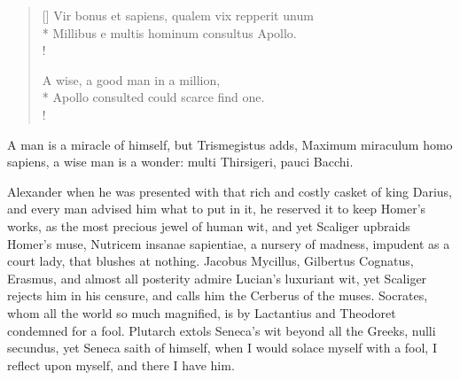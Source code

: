 {\settowidth{\versewidth}{Vir bonus et sapiens, qualem vix repperit unum}
\begin{verse}[\versewidth]
Vir bonus et sapiens, qualem vix repperit unum\\*
Millibus e multis hominum consultus Apollo.\\!

A wise, a good man in a million,\\*
Apollo consulted could scarce find one.\\!
\end{verse}

A man is a miracle of himself, but Trismegistus adds, Maximum miraculum
homo sapiens, a wise man is a wonder: multi Thirsigeri, pauci Bacchi.

Alexander when he was presented with that rich and costly casket of
king Darius, and every man advised him what to put in it, he reserved
it to keep Homer's works, as the most precious jewel of human wit, and
yet  Scaliger upbraids Homer's muse, Nutricem insanae sapientiae,
a nursery of madness, impudent as a court lady, that blushes at
nothing. Jacobus Mycillus, Gilbertus Cognatus, Erasmus, and almost all
posterity admire Lucian's luxuriant wit, yet Scaliger rejects him in
his censure, and calls him the Cerberus of the muses. Socrates, whom
all the world so much magnified, is by Lactantius and Theodoret
condemned for a fool. Plutarch extols Seneca's wit beyond all the
Greeks, nulli secundus, yet  Seneca saith of himself, when I would
solace myself with a fool, I reflect upon myself, and there I have him.

}
